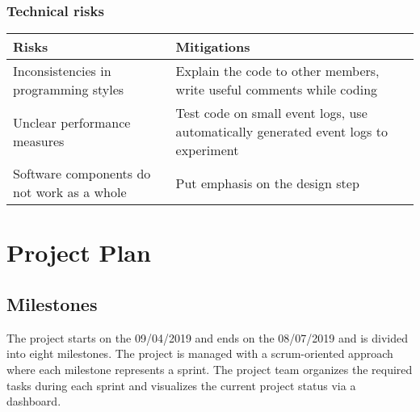 \documentclass[notitlepage]{article}
\begin{document}
\begin{flushleft}
\subsubsection{Technical risks}

\begin{tabularx}{15cm}{|X|X|}
\hline
\textbf{Risks} &\textbf{Mitigations}\\
\hline
Inconsistencies in programming styles & Explain the code to other members, write useful comments while coding\\
\hline
Unclear performance measures & Test code on small event logs, use automatically generated event logs to experiment \\
\hline
Software components do not work as a whole & Put emphasis on the design step \\ 
\hline
\end{tabularx}



\section{Project Plan}

\subsection{Milestones}

The project starts on the 09/04/2019 and ends on the 08/07/2019 and is divided into eight milestones. The project is managed with a scrum-oriented approach
where each milestone represents a sprint. The project team organizes the required tasks during each sprint and visualizes the current project status via a dashboard.


\end{flushleft}
\end{document}
